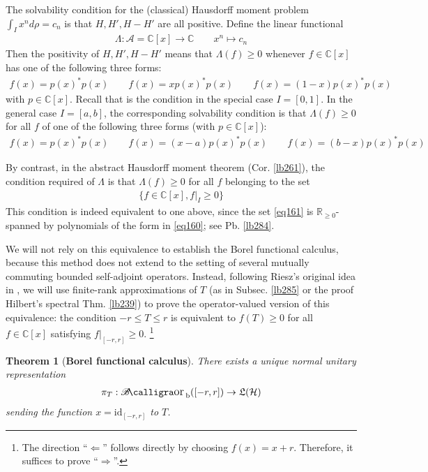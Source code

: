 \documentclass[12pt,b5paper,notitlepage]{article}
\theoremstyle{definition}
\theoremstyle{plain}
\newtheorem{thm}[df]{Theorem}
\DeclareMathOperator{\Borb}{{\mathscr{B}\text{\kern -2pt {\calligra\large or}}\,}_{\mathrm b}}
\newcommand{\fk}{\mathfrak}
\newcommand{\id}{\mathrm{id}}
\newcommand{\scr}{\mathscr}
\newcommand{\Cbb}{\mathbb C}
\newcommand{\Rbb}{\mathbb R}
\newcommand{\MH}{\mathcal H}
\numberwithin{equation}{section}
\begin{document}
The solvability condition for the (classical) Hausdorff moment problem $\int_I x^nd\rho=c_n$ is that $H,H',H-H'$ are all positive. Define the linear functional
\begin{align*}
\Lambda:\scr A=\Cbb[x]\rightarrow\Cbb\qquad x^n\mapsto c_n
\end{align*}
Then the positivity of $H,H',H-H'$ means that $\Lambda(f)\geq0$ whenever $f\in\Cbb[x]$ has one of the following three forms:
\begin{align*}
f(x)=p(x)^*p(x)\qquad f(x)=xp(x)^*p(x)\qquad f(x)=(1-x)p(x)^*p(x)
\end{align*}
with $p\in\Cbb[x]$. Recall that is the condition in the special case $I=[0,1]$. In the general case $I=[a,b]$, the corresponding solvability condition is that $\Lambda(f)\geq0$ for all $f$ of one of the following three forms (with $p\in\Cbb[x]$):
\begin{align}\label{eq160}
f(x)=p(x)^*p(x)\qquad f(x)=(x-a)p(x)^*p(x)\qquad f(x)=(b-x)p(x)^*p(x)
\end{align}


By contrast, in the abstract Hausdorff moment theorem (Cor. \ref{lb261}), the condition required of $\Lambda$ is that $\Lambda(f)\geq0$ for all $f$ belonging to the set
\begin{align}\label{eq161}
\{f\in\Cbb[x],f|_I\geq0\}
\end{align}
This condition is indeed equivalent to one above, since the set \eqref{eq161} is $\Rbb_{\geq0}$-spanned by polynomials of the form in \eqref{eq160}; see Pb. \ref{lb284}.


We will not rely on this equivalence to establish the Borel functional calculus, because this method does not extend to the setting of several mutually commuting bounded self-adjoint operators. Instead, following Riesz's original idea in \cite{Rie13}, we will use finite-rank approximations of $T$ (as in Subsec. \ref{lb285} or the proof Hilbert's spectral Thm. \ref{lb239}) to  prove the operator-valued version of this equivalence: the condition $-r\leq T\leq r$ is equivalent to $f(T)\geq0$ for all $f\in\Cbb[x]$ satisfying $f|_{[-r,r]}\geq0$. \footnote{The direction ``$\Leftarrow$'' follows directly by choosing $f(x)=x+r$. Therefore, it suffices to prove ``$\Rightarrow$''.}






\begin{thm}[\textbf{Borel functional calculus}]\label{lb283}
There exists a unique normal unitary representation
\begin{align*}
\pi_T:\Borb([-r,r])\rightarrow\fk L(\MH)
\end{align*}
sending the function $x=\id_{[-r,r]}$ to $T$.
\end{thm}
\end{document}
